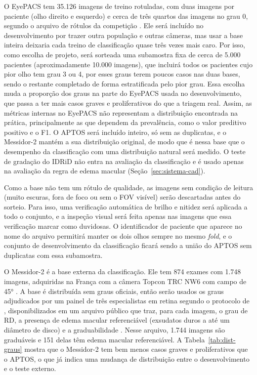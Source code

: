 O EyePACS tem 35.126 imagens de treino rotuladas, com duas imagens por paciente (olho direito e esquerdo) e cerca de três quartos das imagens no grau 0, segundo o arquivo de rótulos da competição \cite{eyepacs2015}. Ele será incluído no desenvolvimento por trazer outra população e outras câmeras, mas usar a base inteira deixaria cada treino de classificação quase três vezes mais caro. Por isso, como escolha de projeto, será sorteada uma subamostra fixa de cerca de 5.000 pacientes (aproximadamente 10.000 imagens), que incluirá todos os pacientes cujo pior olho tem grau 3 ou 4, por esses graus terem poucos casos nas duas bases, sendo o restante completado de forma estratificada pelo pior grau. Essa escolha muda a proporção dos graus na parte do EyePACS usada no desenvolvimento, que passa a ter mais casos graves e proliferativos do que a triagem real. Assim, as métricas internas no EyePACS não representam a distribuição encontrada na prática, principalmente as que dependem da prevalência, como o valor preditivo positivo e o F1. O APTOS será incluído inteiro, só sem as duplicatas, e o Messidor-2 mantém a sua distribuição original, de modo que é nessa base que o desempenho da classificação com uma distribuição natural será medido. O teste de gradação do IDRiD não entra na avaliação da classificação e é usado apenas na avaliação da regra de edema macular (Seção~\ref{sec:sistema-cad}).

Como a base não tem um rótulo de qualidade, as imagens sem condição de leitura (muito escuras, fora de foco ou sem o FOV visível) serão descartadas antes do sorteio. Para isso, uma verificação automática de brilho e nitidez será aplicada a todo o conjunto, e a inspeção visual será feita apenas nas imagens que essa verificação marcar como duvidosas. O identificador de paciente que aparece no nome do arquivo permitirá manter os dois olhos sempre no mesmo \textit{fold}, e o conjunto de desenvolvimento da classificação ficará sendo a união do APTOS sem duplicatas com essa subamostra.

O Messidor-2 é a base externa da classificação. Ele tem 874 exames com 1.748 imagens, adquiridas na França com a câmera Topcon TRC NW6 com campo de 45° \cite{decenciere2014messidor, boumeshed2026modular}. A base é distribuída sem graus oficiais, então serão usados os graus adjudicados por um painel de três especialistas em retina segundo o protocolo de , disponibilizados em um arquivo público que traz, para cada imagem, o grau de RD, a presença de edema macular referenciável (exsudatos duros a até um diâmetro de disco) e a graduabilidade \cite{googlebrain2018messidor2}. Nesse arquivo, 1.744 imagens são graduáveis e 151 delas têm edema macular referenciável. A Tabela~\ref{tab:dist-graus} mostra que o Messidor-2 tem bem menos casos graves e proliferativos que o APTOS, o que já indica uma mudança de distribuição entre o desenvolvimento e o teste externo.

